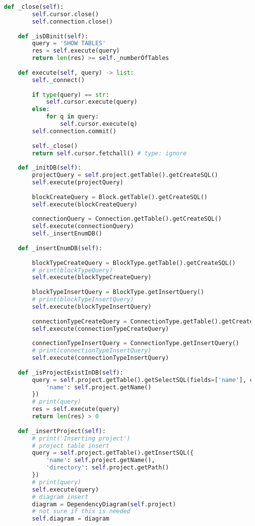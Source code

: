 \begin{lstlisting}[language=Python, caption={$\texttt{DBMS}$ class.}, label={lst:21}]
    def _close(self):
        self.cursor.close()
        self.connection.close()
        
    def _isDBinit(self):
        query = 'SHOW TABLES'
        res = self.execute(query)
        return len(res) >= self._numberOfTables
    
    def execute(self, query) -> list:
        self._connect()
        
        if type(query) == str:
            self.cursor.execute(query)
        else:
            for q in query:
                self.cursor.execute(q)
        self.connection.commit()
        
        self._close()
        return self.cursor.fetchall() # type: ignore
    
    def _initDB(self):
        projectQuery = self.project.getTable().getCreateSQL()
        self.execute(projectQuery)
        
        blockCreateQuery = Block.getTable().getCreateSQL()
        self.execute(blockCreateQuery)
        
        connectionQuery = Connection.getTable().getCreateSQL()
        self.execute(connectionQuery)
        self._insertEnumDB()
        
    def _insertEnumDB(self):
        
        blockTypeCreateQuery = BlockType.getTable().getCreateSQL()
        # print(blockTypeQuery)
        self.execute(blockTypeCreateQuery)
        
        blockTypeInsertQuery = BlockType.getInsertQuery()
        # print(blockTypeInsertQuery)
        self.execute(blockTypeInsertQuery)
        
        connectionTypeCreateQuery = ConnectionType.getTable().getCreateSQL()
        self.execute(connectionTypeCreateQuery)
        
        connectionTypeInsertQuery = ConnectionType.getInsertQuery()
        # print(connectionTypeInsertQuery)
        self.execute(connectionTypeInsertQuery)
    
    def _isProjectExistInDB(self):
        query = self.project.getTable().getSelectSQL(fields=['name'], conditions={
            'name': self.project.getName()
        })
        # print(query)
        res = self.execute(query)
        return len(res) > 0
    
    def _insertProject(self):
        # print('Inserting project')
        # project table insert
        query = self.project.getTable().getInsertSQL({
            'name': self.project.getName(),
            'directory': self.project.getPath()
        })
        # print(query)
        self.execute(query)
        # diagram insert
        diagram = DependencyDiagram(self.project)
        # not sure if this is needed
        self.diagram = diagram
        

\end{lstlisting}
